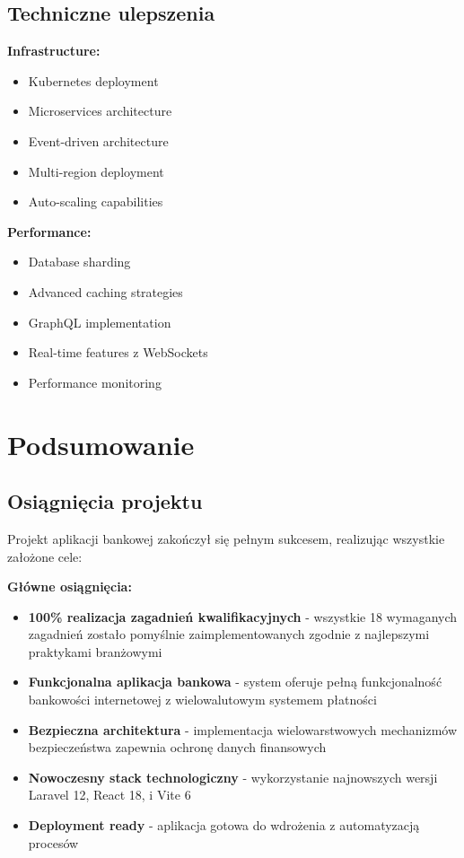 \documentclass[12pt,a4paper]{article}
\begin{document}
    \subsection{Techniczne ulepszenia}

    \textbf{Infrastructure:}
    \begin{itemize}
        \item Kubernetes deployment
        \item Microservices architecture
        \item Event-driven architecture
        \item Multi-region deployment
        \item Auto-scaling capabilities
    \end{itemize}

    \textbf{Performance:}
    \begin{itemize}
        \item Database sharding
        \item Advanced caching strategies
        \item GraphQL implementation
        \item Real-time features z WebSockets
        \item Performance monitoring
    \end{itemize}

    \section{Podsumowanie}

    \subsection{Osiągnięcia projektu}

    Projekt aplikacji bankowej zakończył się pełnym sukcesem, realizując wszystkie założone cele:

    \textbf{Główne osiągnięcia:}
    \begin{itemize}
        \item \textbf{100\% realizacja zagadnień kwalifikacyjnych} - wszystkie 18 wymaganych zagadnień zostało pomyślnie zaimplementowanych zgodnie z najlepszymi praktykami branżowymi
        \item \textbf{Funkcjonalna aplikacja bankowa} - system oferuje pełną funkcjonalność bankowości internetowej z wielowalutowym systemem płatności
        \item \textbf{Bezpieczna architektura} - implementacja wielowarstwowych mechanizmów bezpieczeństwa zapewnia ochronę danych finansowych
        \item \textbf{Nowoczesny stack technologiczny} - wykorzystanie najnowszych wersji Laravel 12, React 18, i Vite 6
        \item \textbf{Deployment ready} - aplikacja gotowa do wdrożenia z automatyzacją procesów
    \end{itemize}
\end{document}

